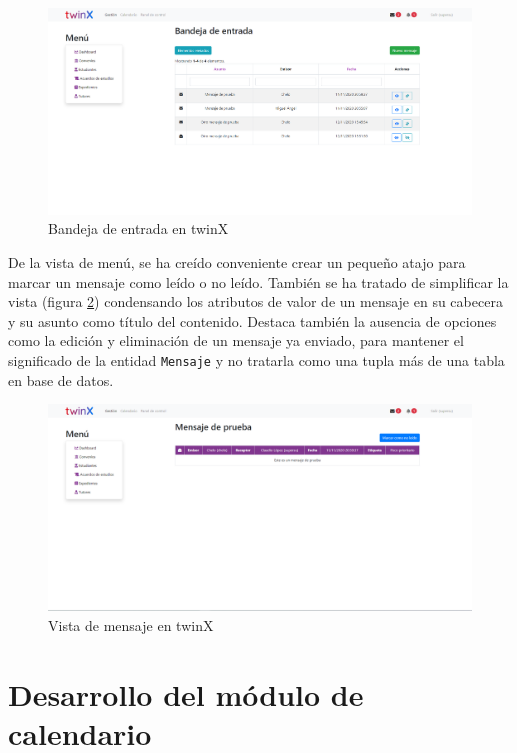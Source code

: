 \begin{figure}
	\centering
	\includegraphics[width=\linewidth]{img/Capturas de twinX/bandeja_entrada}
	\caption{Bandeja de entrada en twinX}
	\label{fig:bandejaentradatwinX}
\end{figure}

De la vista de menú, se ha creído conveniente crear un pequeño atajo para marcar un mensaje como leído o no leído. También se ha tratado de simplificar la vista (figura \ref{fig:vistamensajetwinX}) condensando los atributos de valor de un mensaje en su cabecera y su asunto como título del contenido. Destaca también la ausencia de opciones como la edición y eliminación de un mensaje ya enviado, para mantener el significado de la entidad \texttt{Mensaje} y no tratarla como una tupla más de una tabla en base de datos.

\begin{figure}
	\centering
	\includegraphics[width=\linewidth]{img/Capturas de twinX/vista_mensaje}
	\caption{Vista de mensaje en twinX}
	\label{fig:vistamensajetwinX}
\end{figure}


\section{Desarrollo del módulo de calendario}

